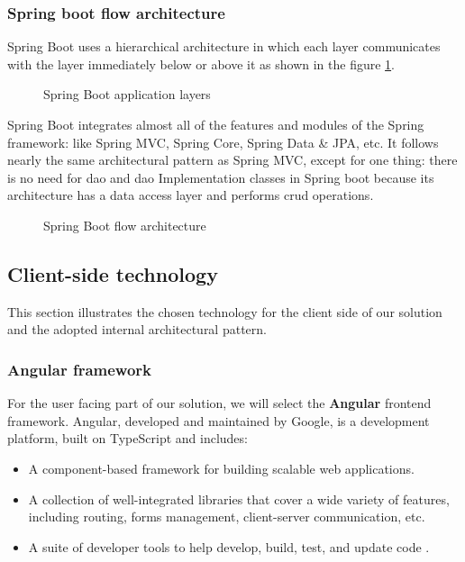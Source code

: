 \subsubsection{Spring boot flow architecture}
Spring Boot uses a hierarchical architecture in which each layer communicates with the layer immediately
below or above it as shown in the figure \ref{layers}. \\

\begin{figure}[hbt!]
      \centering
      
      \caption{Spring Boot application layers}
      \label{layers}
\end{figure}

\noindent Spring Boot integrates almost all of the features and modules of the Spring framework: like Spring MVC,
Spring Core, Spring Data \& JPA, etc. It follows nearly the same architectural pattern as
Spring MVC, except for one thing: there is no need for \acrfull{dao} and \acrshort{dao} Implementation
classes in Spring boot because its architecture has a data access layer and performs \acrshort{crud}
operations. \\

\begin{figure}[hbt!]
      \centering
      
      \caption{Spring Boot flow architecture}
      \label{flow}
\end{figure}


\subsection{Client-side technology}
This section illustrates the chosen technology for the client side of our solution and the adopted
internal architectural pattern.

\subsubsection{Angular framework}
For the user facing part of our solution, we will select the \textbf{Angular} frontend framework.
Angular, developed and maintained by Google, is a development platform, built on TypeScript and
includes:
\begin{itemize}
      \item A component-based framework for building scalable web applications.
      \item A collection of well-integrated libraries that cover a wide variety of features,
            including routing, forms management, client-server communication, etc.
      \item A suite of developer tools to help develop, build, test, and update code \cite{angular}.
\end{itemize}
\raggedbottom

